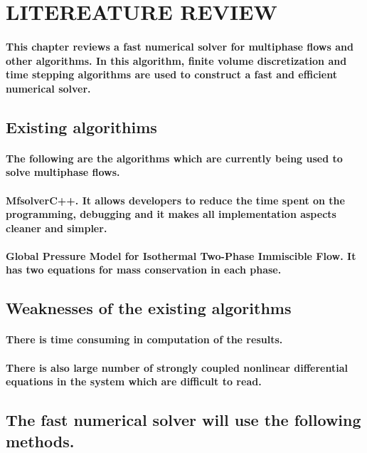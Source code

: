 \documentclass{article}
\begin{document}
\section{LITEREATURE REVIEW}
\paragraph{This chapter reviews a fast numerical solver for multiphase flows and other algorithms. In this algorithm, finite volume discretization and time stepping algorithms are used to construct a fast and efficient numerical solver.}
\subsection{Existing algorithims}

\paragraph{
The following are the algorithms which are currently being used to solve multiphase flows.}

\paragraph{MfsolverC++. It allows developers to reduce the time spent on the programming, debugging and it makes all implementation aspects cleaner and simpler.}
\paragraph{Global Pressure Model for Isothermal Two-Phase Immiscible Flow. It has two equations for mass conservation in each phase.}
\subsection{Weaknesses of the existing algorithms}
\paragraph{There is time consuming in computation of the results.}
\paragraph{There is also large number of strongly coupled  nonlinear  differential equations in the system which are difficult to read.}
\subsection{The fast numerical solver will use the following methods.}
\end{document}
